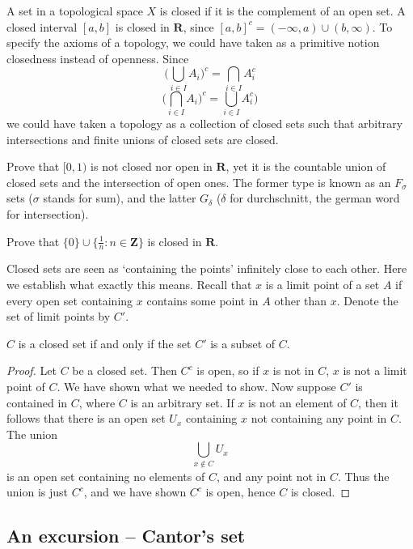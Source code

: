 A set in a topological space $X$ is closed if it is the complement of an open set. A closed interval $[a,b]$ is closed in $\mathbf{R}$, since $[a,b]^c = (-\infty, a) \cup (b,\infty)$. To specify the axioms of a topology, we could have taken as a primitive notion closedness instead of openness. Since
%
\[ \big( \bigcup_{i \in I} A_i \big)^c = \bigcap_{i \in I} A_i^c \]
%
\[ \big( \bigcap_{i \in I} A_i \big)^c = \bigcup_{i \in I} A_i^c \big) \]
%
we could have taken a topology as a collection of closed sets such that arbitrary intersections and finite unions of closed sets are closed.

\begin{example}
    Prove that $[0,1)$ is not closed nor open in $\mathbf{R}$, yet it is the countable union of closed sets and the intersection of open ones. The former type is known as an $F_\sigma$ sets ($\sigma$ stands for sum), and the latter $G_\delta$ ($\delta$ for durchschnitt, the german word for intersection).
\end{example}

\begin{example}
    Prove that $\{0\} \cup \{ \frac{1}{n} : n \in \mathbf{Z} \}$ is closed in $\mathbf{R}$.
\end{example}

Closed sets are seen as `containing the points' infinitely close to each other. Here we establish what exactly this means. Recall that $x$ is a limit point of a set $A$ if every open set containing $x$ contains some point in $A$ other than $x$. Denote the set of limit points by $C'$.

\begin{example}
    $C$ is a closed set if and only if the set $C'$ is a subset of $C$.
\end{example}
\begin{proof}
    Let $C$ be a closed set. Then $C^c$ is open, so if $x$ is not in $C$, $x$ is not a limit point of $C$. We have shown what we needed to show. Now suppose $C'$ is contained in $C$, where $C$ is an arbitrary set. If $x$ is not an element of $C$, then it follows that there is an open set $U_x$ containing $x$ not containing any point in $C$. The union
    \[ \bigcup_{x \notin C} U_x \]
    is an open set containing no elements of $C$, and any point not in $C$. Thus the union is just $C^c$, and we have shown $C^c$ is open, hence $C$ is closed.
\end{proof}

\subsection{An excursion -- Cantor's set}

